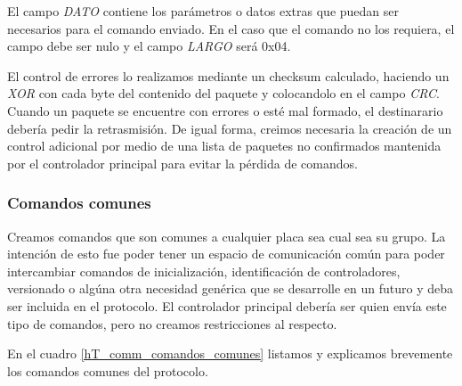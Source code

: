 El campo \emph{DATO} contiene los par\'ametros o datos extras que puedan ser necesarios para el comando enviado.
En el caso que el comando no los requiera, el campo debe ser nulo y el campo \emph{LARGO} ser\'a 0x04.

El control de errores lo realizamos mediante un checksum calculado, haciendo un \emph{XOR} con cada byte del contenido del paquete
y colocandolo en el campo \emph{CRC}.
Cuando un paquete se encuentre con errores o est\'e mal formado, el destinarario deber\'ia pedir la retrasmisi\'on.
De igual forma, creimos necesaria la creaci\'on de un control adicional por medio de una lista de paquetes no confirmados mantenida
por el controlador principal para evitar la p\'erdida de comandos.

\subsubsection{Comandos comunes}
\label{h_comm_protocolo_comandosComunes}

Creamos comandos que son comunes a cualquier placa sea cual sea su grupo.
La intenci\'on de esto fue poder tener un espacio de comunicaci\'on com\'un para poder intercambiar comandos
de inicializaci\'on, identificaci\'on de controladores, versionado o alg\'una otra necesidad gen\'erica que
se desarrolle en un futuro y deba ser incluida en el protocolo.
El controlador principal deber\'ia ser quien env\'ia este tipo de comandos, pero no creamos restricciones al respecto.

En el cuadro \ref{hT_comm_comandos_comunes} listamos y explicamos brevemente los comandos comunes del protocolo.

